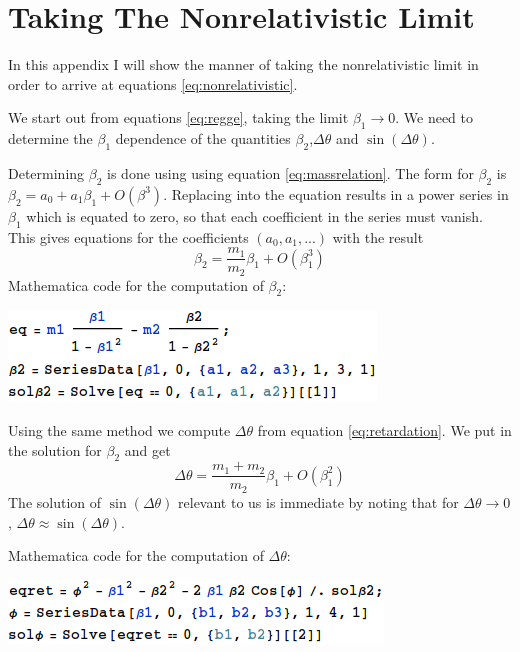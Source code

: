 \documentclass[11pt,a4paper]{article}
\begin{document}
\section{Taking The Nonrelativistic Limit}
\label{sec:nonrelativistic}
In this appendix I will show the manner of taking the nonrelativistic limit in order to arrive at equations \ref{eq:nonrelativistic}.

We start out from equations \ref{eq:regge}, taking the limit $\beta_1\rightarrow0$. We need to determine the $\beta_1$ dependence of the quantities $\beta_2$,$\Delta\theta$ and $\sin\left(\Delta\theta\right)$. 

Determining $\beta_2$ is done using using equation \ref{eq:massrelation}. The form for $\beta_2$ is $\beta_2=a_0+a_1\beta_1+O\left(\beta^3\right)$. Replacing into the equation results in a power series in $\beta_1$ which is equated to zero, so that each coefficient in the series must vanish. This gives equations for the coefficients $\left(a_0,a_1,...\right)$ with the result
\begin{equation*}
\beta_2=\frac{m_1}{m_2}\beta_1+O\left(\beta_1^3\right)
\end{equation*}
Mathematica code for the computation of $\beta_2$:

\includegraphics[scale=0.7]{figures/nonrelativisticb2.png}

Using the same method we compute $\Delta\theta$ from equation \ref{eq:retardation}. We put in the solution for $\beta_2$ and get
\begin{equation*}
\Delta\theta=\frac{m_1+m_2}{m_2}\beta_1+O\left(\beta_1^2\right)
\end{equation*}
The solution of $\sin\left(\Delta\theta\right)$ relevant to us is immediate by noting that for $\Delta\theta\rightarrow0$, $\Delta\theta\approx\sin\left(\Delta\theta\right)$.

Mathematica code for the computation of $\Delta\theta$:

\includegraphics[scale=0.7]{figures/nonrelativisticphi.png}
\end{document}
